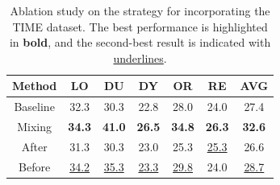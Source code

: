 \begin{table}[t]
\centering

\begin{tabular}{ccccccc}
\toprule
Method  & LO & DU & DY & OR & RE & AVG \\
\midrule
Baseline & 32.3 & 30.3 & 22.8 & 28.0 & 24.0 & 27.4 \\
Mixing  & \textbf{34.3} & \textbf{41.0} & \textbf{26.5} & \textbf{34.8} & \textbf{26.3} & \textbf{32.6} \\
After   & 31.3 & 30.3 & 23.0 & 25.3 & \underline{25.3} & 26.6 \\
Before  & \underline{34.2} & \underline{35.3} & \underline{23.3} & \underline{29.8} & 24.0 & \underline{28.7} \\
\bottomrule
\end{tabular}

\caption{Ablation study on the strategy for incorporating the TIME dataset. The best performance is highlighted in \textbf{bold}, and the second-best result is indicated with \underline{underlines}.}
\label{tab:time}
\end{table}